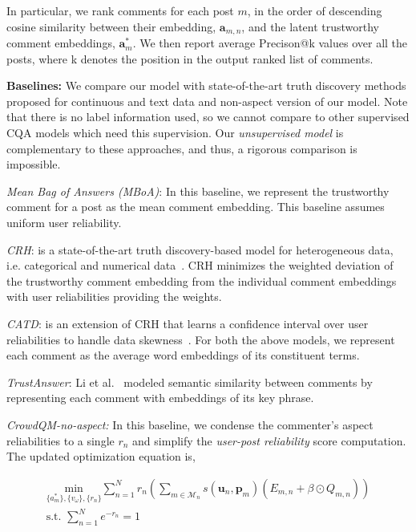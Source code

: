 In particular, we rank comments for each post $m$, in the order of descending cosine similarity between their embedding, $\bm{a}_{m,n}$, and the latent trustworthy comment embeddings, $\bm{a}_m^*$. We then report average Precison@k values over all the posts, where k denotes the position in the output ranked list of comments.


\noindent
\textbf{Baselines:} We compare our model with state-of-the-art truth discovery methods proposed for continuous and text data and non-aspect version of our model. Note that there is no label information used, so we cannot compare to other supervised CQA models \cite{Quality2008,wen2018hybrid,nakov2017semeval} which need this supervision. Our \emph{unsupervised model} is complementary to these approaches, and thus, a rigorous comparison is impossible.


\noindent
\emph{Mean Bag of Answers (MBoA)}: In this baseline, we represent the trustworthy comment for a post as the mean comment embedding. This baseline assumes uniform user reliability.

\noindent
\emph{CRH}: is a state-of-the-art truth discovery-based model for heterogeneous data, i.e. categorical and numerical data~\cite{li2014resolving}. CRH minimizes the weighted deviation of the trustworthy comment embedding from the individual comment embeddings with user reliabilities providing the weights.

\noindent
\emph{CATD}: is an extension of CRH that learns a confidence interval over user reliabilities to handle data skewness~\cite{li2014confidence}. For both the above models, we represent each comment as the average word embeddings of its constituent terms.

\noindent
\emph{TrustAnswer}: Li et al.~\cite{li2017reliable} modeled semantic similarity between comments by representing each comment with embeddings of its key phrase.

\noindent
\emph{CrowdQM-no-aspect:} In this baseline, we condense the commenter's aspect reliabilities to a single $r_n$ and simplify the \emph{user-post reliability} score computation. The updated optimization equation  is,

\begin{equation}
\begin{aligned}
\underset{\{a_m^{*}\}, \{v_{\omega}\}, \{r_n\}  }{\text{min}}
\sum_{n=1}^{N} r_n \left( \sum_{m \in \mathcal{M}_n} s(\bm{u}_{n}, \bm{p}_{m}) \left( E_{m, n} + \beta \odot Q_{m, n} \right) \right)  \\
\text{s.t.  } \sum_{n=1}^{N} e^{-r_n} = 1
\end{aligned}
\end{equation}

